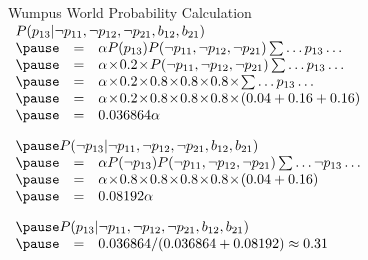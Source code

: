 \documentclass[12pt]{beamer}
\begin{document}
\begin{frame}{Wumpus World Probability Calculation}
	$
	\begin{array}{lll}
	\lefteqn{P(p_{13}|\lnot p_{11}, \lnot p_{12}, \lnot p_{21}, b_{12}, b_{21})}
	\\
	\pause
	& = &
	\alpha
	P(p_{13})
	P(\lnot p_{11},\lnot p_{12},\lnot p_{21})
	\sum\ldots p_{13}\ldots
	\\
	\pause
	& = &
	\alpha \!\times\!
  0.2 \!\times\!
	P(\lnot p_{11},\lnot p_{12},\lnot p_{21})
	\sum\ldots p_{13}\ldots
  \\
  \pause
  & = &
  \alpha \!\times\!
  0.2 \!\times\!
  0.8 \!\times\! 0.8 \!\times\! 0.8 \!\times\!
  \sum\ldots p_{13}\ldots
  \\
  \pause
  & = &
  \alpha \!\times\!
  0.2 \!\times\!
  0.8 \!\times\! 0.8 \!\times\! 0.8 \!\times\!
  (0.04 + 0.16 + 0.16)
  \\
  \pause
  & = & 0.036864\alpha
  \\[1em]
  \pause
	\lefteqn{P(\lnot p_{13}|\lnot p_{11}, \lnot p_{12}, \lnot p_{21}, b_{12}, b_{21})}
	\\
	\pause
	& = & 
	\alpha
	P(\lnot p_{13})
	P(\lnot p_{11},\lnot p_{12},\lnot p_{21})
	\sum\ldots \lnot p_{13}\ldots
  \\
  \pause
  & = &
  \alpha \!\times\!
  0.8 \!\times\!
  0.8 \!\times\! 0.8 \!\times\! 0.8 \!\times\!
  (0.04 + 0.16)
  \\
  \pause
  & = & 0.08192\alpha
  \\[1em]
  \pause
  \lefteqn{P(p_{13}|\lnot p_{11}, \lnot p_{12}, \lnot p_{21}, b_{12}, b_{21})}
  \\
  \pause
  & = & 0.036864 / (0.036864 + 0.08192) \approx 0.31
  \end{array}
  $
\end{frame}
\end{document}

